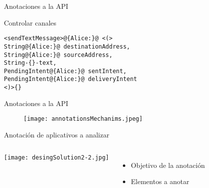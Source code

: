 \begin{frame}[fragile]{Anotaciones a la API}
\begin{block}{Controlar canales}
\begin{lstlisting}[style=base]
<sendTextMessage>@{Alice:}@ <(> 
String@{Alice:}@ destinationAddress, 
String@{Alice:}@ sourceAddress, 
String-{}-text, 
PendingIntent@{Alice:}@ sentIntent,
PendingIntent@{Alice:}@ deliveryIntent 
<)>{}
\end{lstlisting} 
\end{block}
\end{frame}

\begin{frame}{Anotaciones a la API}
	\begin{figure}[t!]
		\begin{center} 
		\texttt{[image: annotationsMechanims.jpeg]} 
		\end{center}
	\end{figure}
\end{frame}
\begin{frame}{Anotación de aplicativos a analizar}
	\begin{columns}[c]
			\texttt{[image: desingSolution2-2.jpg]}
		\column{1.5in}
			\begin{itemize}
	  		\item Objetivo de la anotación
	  		\item Elementos a anotar
			\end{itemize}
	\end{columns}
\end{frame}
